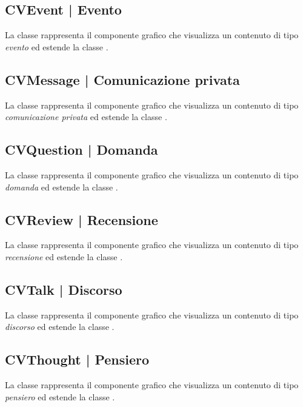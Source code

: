 \documentclass[10pt,a4paper,headinclude,footinclude,hidelinks]{scrreprt} %
\begin{document}
	\subsection[CVEvent]{CVEvent | Evento}
	\label{sec:stage:design:view:event}
	La classe rappresenta il componente grafico che visualizza un contenuto di tipo \textit{evento} ed estende la classe \textit{}.

	\subsection[CVMessage]{CVMessage | Comunicazione privata}
	\label{sec:stage:design:view:message}
	La classe rappresenta il componente grafico che visualizza un contenuto di tipo \textit{comunicazione privata} ed estende la classe \textit{}.

	\subsection[CVQuestion]{CVQuestion | Domanda}
	\label{sec:stage:design:view:question}
	La classe rappresenta il componente grafico che visualizza un contenuto di tipo \textit{domanda} ed estende la classe \textit{}.

	\subsection[CVReview]{CVReview | Recensione}
	\label{sec:stage:design:view:review}
	La classe rappresenta il componente grafico che visualizza un contenuto di tipo \textit{recensione} ed estende la classe \textit{}.

	\subsection[CVTalk]{CVTalk | Discorso}
	\label{sec:stage:design:view:talk}
	La classe rappresenta il componente grafico che visualizza un contenuto di tipo \textit{discorso} ed estende la classe \textit{}.

	\subsection[CVThought]{CVThought | Pensiero}
	\label{sec:stage:design:view:thought}
	La classe rappresenta il componente grafico che visualizza un contenuto di tipo \textit{pensiero} ed estende la classe \textit{}.
\end{document}
